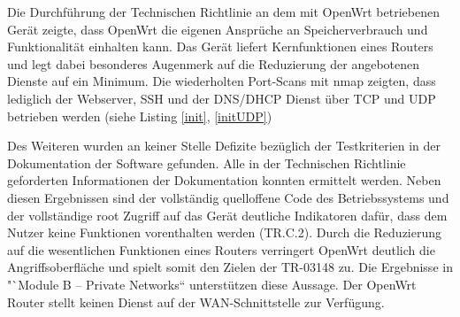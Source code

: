 \documentclass[a4paper]{book}
\begin{document}
\begin{large}
\begin{onehalfspace}
	Die Durchführung der Technischen Richtlinie an dem mit OpenWrt betriebenen Gerät zeigte, dass OpenWrt die eigenen Ansprüche an Speicherverbrauch und Funktionalität einhalten kann. Das Gerät liefert Kernfunktionen eines Routers und legt dabei besonderes Augenmerk auf die Reduzierung der angebotenen Dienste auf ein Minimum. Die wiederholten Port-Scans mit nmap zeigten, dass lediglich der Webserver, SSH und der DNS/DHCP Dienst über TCP und UDP betrieben werden (siehe Listing \ref{init}, \ref{initUDP}) \\



\vspace{0.6cm}



\noindent Des Weiteren wurden an keiner Stelle Defizite bezüglich der Testkriterien in der Dokumentation der Software gefunden. Alle in der Technischen Richtlinie geforderten Informationen der Dokumentation konnten ermittelt werden. Neben diesen Ergebnissen sind der vollständig quelloffene Code des Betriebssystems und der vollständige root Zugriff auf das Gerät deutliche Indikatoren dafür, dass dem Nutzer keine Funktionen vorenthalten werden (TR.C.2). Durch die Reduzierung auf die wesentlichen Funktionen eines Routers verringert OpenWrt deutlich die Angriffsoberfläche und spielt somit den Zielen der TR-03148 zu. Die Ergebnisse in "`Module B – Private Networks“ unterstützen diese Aussage. Der OpenWrt Router stellt keinen Dienst auf der WAN-Schnittstelle zur Verfügung. \\



\vspace{0.5cm}




\end{onehalfspace}
\end{large}
\end{document}
